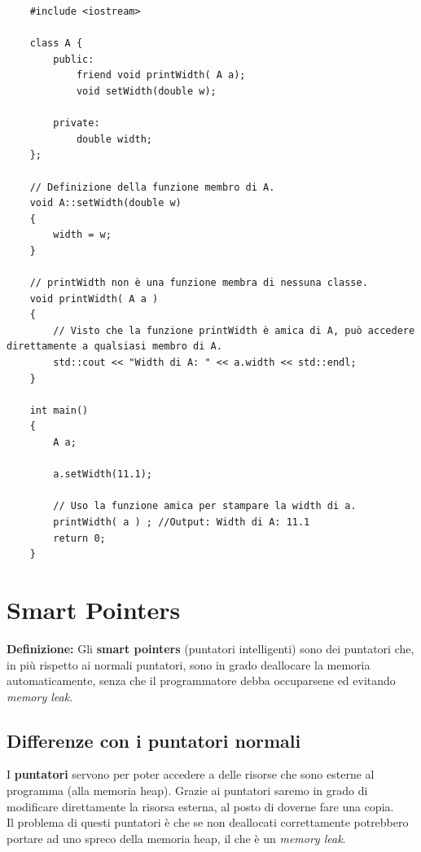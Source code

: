 \begin{lstlisting}
	#include <iostream>
	
	class A {
		public:
			friend void printWidth( A a);
			void setWidth(double w);
			
		private:
			double width;
	};

	// Definizione della funzione membro di A.
	void A::setWidth(double w)
	{
		width = w;
	}

	// printWidth non è una funzione membra di nessuna classe.
	void printWidth( A a )
	{
		// Visto che la funzione printWidth è amica di A, può accedere direttamente a qualsiasi membro di A.
		std::cout << "Width di A: " << a.width << std::endl;
	}

	int main()
	{
		A a;
		
		a.setWidth(11.1);
		
		// Uso la funzione amica per stampare la width di a.
		printWidth( a ) ; //Output: Width di A: 11.1
		return 0;
	}
\end{lstlisting}


\newpage

\section{Smart Pointers}

\textsf{\small \textbf{Definizione: } Gli \textbf{smart pointers} (puntatori intelligenti) sono dei puntatori che, in più rispetto ai normali puntatori, sono in grado deallocare la memoria automaticamente, senza che il programmatore debba occuparsene ed evitando \emph{memory leak}.} \\

\subsection{Differenze con i puntatori normali}

\textsf{\small I \textbf{puntatori} servono per poter accedere a delle risorse che sono esterne al programma (alla memoria heap). Grazie ai puntatori saremo in grado di modificare direttamente la risorsa esterna, al posto di doverne fare una copia.} \\

\textsf{\small Il problema di questi puntatori è che se non deallocati correttamente potrebbero portare ad uno spreco della memoria heap, il che è un \emph{memory leak}.} \\

